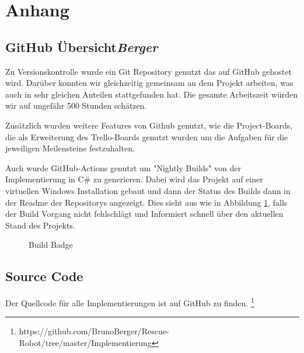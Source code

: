 
\section{Anhang}

\subsection{GitHub Übersicht\hfill\textnormal{\emph{Berger}}}

Zu Versionskontrolle wurde ein Git Repository genutzt 
das auf GitHub gehostet wird.
Darüber konnten wir gleichzeitig gemeinsam an dem Projekt arbeiten,
was auch in sehr gleichen Anteilen stattgefunden hat.
Die gesamte Arbeitszeit würden wir auf ungefähr 500 Stunden schätzen.

Zusätzlich wurden weitere Features von Github genutzt, 
wie die Project-Boards,
die als Erweiterung des Trello-Boards genutzt wurden 
um die Aufgaben für die jeweiligen Meilensteine festzuhalten.

Auch wurde GitHub-Actions genutzt 
um "Nightly Builds" von der Implementierung in C\# zu generieren.
Dabei wird das Projekt auf einer virtuellen Windows Installation gebaut 
und dann der Status des Builds dann in der Readme der Repositorys angezeigt.
Dies sieht aus wie in Abbildung \ref{fig:buildBadge}, 
falls der Build Vorgang nicht fehlschlägt
und Informiert schnell über den aktuellen Stand des Projekts.

\begin{figure}[H]
  \caption{Build Badge}
  \label{fig:buildBadge}
\end{figure}


\subsection{Source Code}

Der Quellcode für alle Implementierungen ist auf GitHub zu finden.
\footnote{https://github.com/BrunoBerger/Rescue-Robot/tree/master/Implementierung}